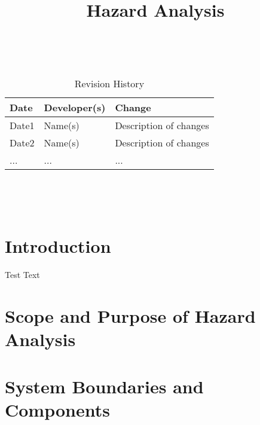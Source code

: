 \documentclass{article}
\title{Hazard Analysis\\\progname}
\author{\authname}
\date{}
\begin{document}
\maketitle
\thispagestyle{empty}

~\newpage


\begin{table}[hp]
\caption{Revision History} \label{TblRevisionHistory}
\begin{tabularx}{\textwidth}{llX}
\toprule
\textbf{Date} & \textbf{Developer(s)} & \textbf{Change}\\
\midrule
Date1 & Name(s) & Description of changes\\
Date2 & Name(s) & Description of changes\\
... & ... & ...\\
\bottomrule
\end{tabularx}
\end{table}

~\newpage

\tableofcontents

~\newpage



\section{Introduction}
Test Text


\section{Scope and Purpose of Hazard Analysis}


\section{System Boundaries and Components}
\end{document}
